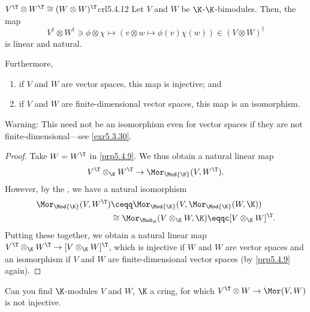 \begin{crl}{$V^{\T}\otimes W^{\T}\cong (W\otimes W)^{\T}$}{crl5.4.12}
	Let $V$ and $W$ be $\K$-$\K$-bimodules.  Then, the map
	\begin{equation}
		V^{\dagger}\otimes W^{\dagger}\ni \phi \otimes \chi \mapsto (v\otimes w\mapsto \phi (v)\chi (w))\in (V\otimes W)^{\dagger}
	\end{equation}
	is linear and natural.
	
	Furthermore,
	\begin{enumerate}
		\item if $V$ and $W$ are vector spaces, this map is injective; and
		\item if $V$ and $W$ are finite-dimensional vector spaces, this map is an isomorphism.
	\end{enumerate}
	\begin{rmk}
		Warning:  This need not be an isomorphism even for vector spaces if they are not finite-dimensional---see \cref{exr5.3.30}.
	\end{rmk}
	\begin{proof}
		Take $W=W^{\T}$ in \cref{prp5.4.9}.  We thus obtain a natural linear map
		\begin{equation}
			V^{\T}\otimes _{\K}W^{\T}\rightarrow \Mor _{\Mod{\K}}(V,W^{\T}).
		\end{equation}
		However, by the , we have a natural isomorphism
		\begin{equation}
			\begin{split}
				\Mor _{\Mod{\K}}(V,W^{\T}) & \ceqq \Mor _{\Mod{\K}}(V,\Mor _{\Mod{\K}}(W,\K )) \\
				& \cong \Mor _{\Mod _{\K}}(V\otimes _{\K}W,\K )\eqqc [V\otimes _{\K}W]^{\T}.
			\end{split}
		\end{equation}
		Putting these together, we obtain a natural linear map $V^{\T}\otimes _{\K}W^{\T}\rightarrow [V\otimes _{\K}W]^{\T}$, which is injective if $W$ and $W$ are vector spaces and an isomorphism if $V$ and $W$ are finite-dimensional vector spaces (by \cref{prp5.4.9} again).
	\end{proof}
\end{crl}
\begin{exr}{}{}
	Can you find $\K$-modules $V$ and $W$, $\K$ a cring, for which $V^{\T}\otimes W\rightarrow \Mor (V,W)$ is not injective.
\end{exr}
